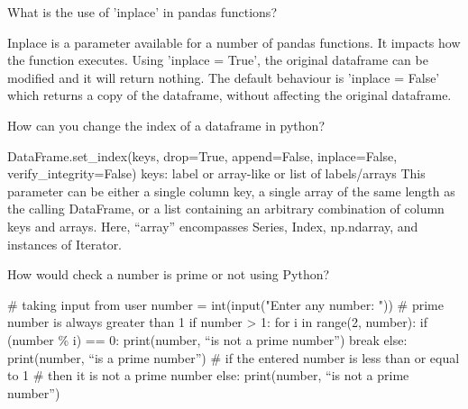 	\begin{qanda}
		\begin{question}
What is the use of 'inplace' in pandas functions?
		\end{question}
		\begin{answer}
Inplace is a parameter available for a number of pandas functions. It impacts how the function executes. Using 'inplace = True', the original dataframe can be modified and it will return nothing. The default behaviour is 'inplace = False' which returns a copy of the dataframe, without affecting the original dataframe.
		\end{answer}
	\end{qanda}

	\begin{qanda}
		\begin{question}
How can you change the index of a dataframe in python?
		\end{question}
		\begin{answer}
DataFrame.set\_index(keys, drop=True, append=False, inplace=False, verify\_integrity=False) keys: label or array-like or list of labels/arrays This parameter can be either a single column key, a single array of the same length as the calling DataFrame, or a list containing an arbitrary combination of column keys and arrays. Here, ``array'' encompasses Series, Index, np.ndarray, and instances of Iterator.
		\end{answer}
	\end{qanda}

	\begin{qanda}
		\begin{question}
 How would check a number is prime or not using Python?
		\end{question}
		\begin{answer}
\# taking input from user number = int(input("Enter any number: ")) \# prime number is always greater than 1 if number > 1: for i in range(2, number): if (number \% i) == 0: print(number, ``is not a prime number'') break else: print(number, ``is a prime number'') \# if the entered number is less than or equal to 1 \# then it is not a prime number else: print(number, ``is not a prime number'')
		\end{answer}
	\end{qanda}

